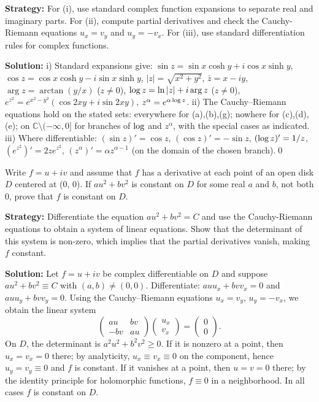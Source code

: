 \noindent\textbf{Strategy:} For (i), use standard complex function expansions to separate real and imaginary parts. For (ii), compute partial derivatives and check the Cauchy-Riemann equations \( u_x = v_y \) and \( u_y = -v_x \). For (iii), use standard differentiation rules for complex functions.

\bigskip\noindent\textbf{Solution:}
i) Standard expansions give: $\sin z=\sin x\cosh y+i\cos x\sinh y$, $\cos z=\cos x\cosh y-i\sin x\sinh y$, $|z|=\sqrt{x^2+y^2}$, $\bar z=x-iy$, $\arg z=\arctan(y/x)$ ($z\ne 0$), $\log z=\ln|z|+i\arg z$ ($z\ne 0$), $e^{z^2}=e^{x^2-y^2}(\cos 2xy+i\sin 2xy)$, $z^{\alpha}=e^{\alpha\log z}$.\newline
ii) The Cauchy–Riemann equations hold on the stated sets: everywhere for (a),(b),(g); nowhere for (c),(d),(e); on $\mathbb{C}\setminus(-\infty,0]$ for branches of $\log$ and $z^{\alpha}$, with the special cases as indicated.\newline
iii) Where differentiable: $(\sin z)'=\cos z$, $(\cos z)'=-\sin z$, $(\log z)'=1/z$, $(e^{z^2})'=2z e^{z^2}$, $(z^{\alpha})'=\alpha z^{\alpha-1}$ (on the domain of the chosen branch).\qed


\begin{problembox}
Write \( f = u + iv \) and assume that \( f \) has a derivative at each point of an open disk \( D \) centered at (0, 0). If \( au^2 + bv^2 \) is constant on \( D \) for some real \( a \) and \( b \), not both 0, prove that \( f \) is constant on \( D \).
\end{problembox}

\noindent\textbf{Strategy:} Differentiate the equation \( au^2 + bv^2 = C \) and use the Cauchy-Riemann equations to obtain a system of linear equations. Show that the determinant of this system is non-zero, which implies that the partial derivatives vanish, making \( f \) constant.

\bigskip\noindent\textbf{Solution:}
Let $f=u+iv$ be complex differentiable on $D$ and suppose $au^2+bv^2\equiv C$ with $(a,b)\ne (0,0)$. Differentiate: $auu_x+bvv_x=0$ and $auu_y+bvv_y=0$. Using the Cauchy–Riemann equations $u_x=v_y$, $u_y=-v_x$, we obtain the linear system
\[\begin{pmatrix}au&bv\\ -bv&au\end{pmatrix}\begin{pmatrix}u_x\\ v_x\end{pmatrix}=\begin{pmatrix}0\\ 0\end{pmatrix}.\]
On $D$, the determinant is $a^2u^2+b^2v^2\ge 0$. If it is nonzero at a point, then $u_x=v_x=0$ there; by analyticity, $u_x\equiv v_x\equiv 0$ on the component, hence $u_y=v_y\equiv 0$ and $f$ is constant. If it vanishes at a point, then $u=v=0$ there; by the identity principle for holomorphic functions, $f\equiv 0$ in a neighborhood. In all cases $f$ is constant on $D$.

